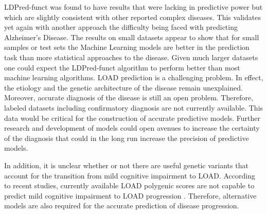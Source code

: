  LDPred-funct was found to have results that were lacking in predictive power but which are slightly consistent with other reported complex diseases. This validates yet again with another approach the difficulty being faced with predicting Alzheimer's Disease. The results on small datasets appear to show that for small samples or test sets the Machine Learning models are better in the prediction task than more statistical approaches to the disease. Given much larger datasets one could expect the LDPred-funct algorithm to perform better than most machine learning algorithms.
 \newpage
 LOAD prediction is a challenging problem. In effect, the etiology and the genetic architecture of the disease remain unexplained. Moreover, accurate diagnosis of the disease is still an open problem. Therefore, labeled datasets including confirmatory diagnosis are not currently available. This data would be critical for the construction of accurate predictive models. Further research and development of models could open avenues to increase the certainty of the diagnosis that could in the long run increase the precision of predictive models.

In addition, it is unclear whether or not there are useful genetic variants that account for the transition from mild cognitive impairment to LOAD. According to recent studies, currently available LOAD polygenic scores are not capable to predict mild cognitive impairment to LOAD progression \cite{Lacour2016}. Therefore, alternative models are also required for the accurate prediction of disease progression.